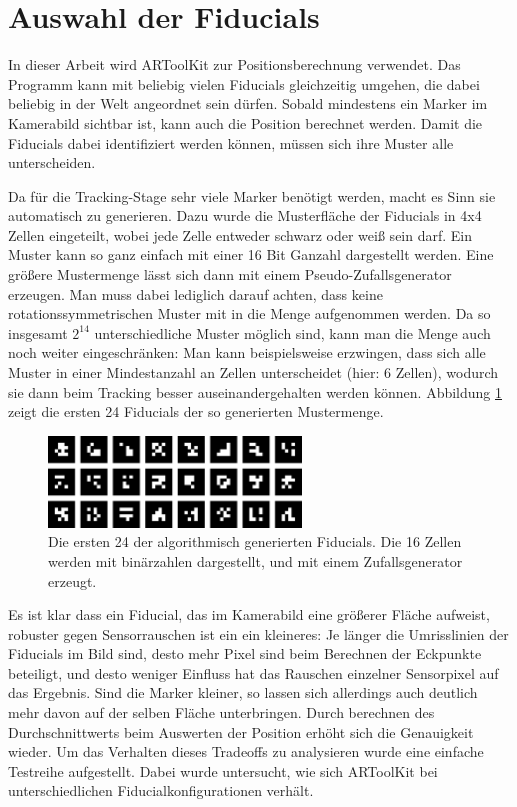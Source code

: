   
      
  \section{Auswahl der Fiducials}
   
   In dieser Arbeit wird ARToolKit zur Positionsberechnung verwendet. Das Programm kann mit beliebig vielen Fiducials gleichzeitig umgehen, die dabei beliebig in der Welt angeordnet sein dürfen.
   Sobald mindestens ein Marker im Kamerabild sichtbar ist, kann auch die Position berechnet werden.
   Damit die Fiducials dabei identifiziert werden können, müssen sich ihre Muster alle unterscheiden.
   
   Da für die Tracking-Stage sehr viele Marker benötigt werden, macht es Sinn sie automatisch zu generieren.
   Dazu wurde die Musterfläche der Fiducials in 4x4 Zellen eingeteilt, wobei jede Zelle entweder schwarz oder weiß sein darf.
   Ein Muster kann so ganz einfach mit einer 16 Bit Ganzahl dargestellt werden. 
   Eine größere Mustermenge lässt sich dann mit einem Pseudo-Zufallsgenerator erzeugen.
   Man muss dabei lediglich darauf achten, dass keine rotationssymmetrischen Muster mit in die Menge aufgenommen werden.
   Da so insgesamt $2^{14}$ unterschiedliche Muster möglich sind, kann man die Menge auch noch weiter eingeschränken:
   Man kann beispielsweise erzwingen, dass sich alle Muster in einer Mindestanzahl an Zellen unterscheidet (hier: 6 Zellen), wodurch sie dann beim Tracking besser auseinandergehalten werden können.
   Abbildung \ref{fig:fiducial_panel} zeigt die ersten 24 Fiducials der so generierten Mustermenge.

  \begin{figure}[H]
   \centering
   \includegraphics[width=0.6\textwidth]{../graphics/position/fiducial_panel_large.svg}
    \caption[Generierte Fiducials]{Die ersten 24 der algorithmisch generierten Fiducials. Die 16 Zellen werden mit binärzahlen dargestellt, und mit einem Zufallsgenerator erzeugt. } 
   \label{fig:fiducial_panel}
   \end{figure}

   Es ist klar dass ein Fiducial, das im Kamerabild eine größerer Fläche aufweist, robuster gegen Sensorrauschen ist ein ein kleineres:
   Je länger die Umrisslinien der Fiducials im Bild sind, desto mehr Pixel sind beim Berechnen der Eckpunkte beteiligt, und desto weniger Einfluss hat das Rauschen einzelner Sensorpixel auf das Ergebnis.
   Sind die Marker kleiner, so lassen sich allerdings auch deutlich mehr davon auf der selben Fläche unterbringen.
   Durch berechnen des Durchschnittwerts beim Auswerten der Position erhöht sich die Genauigkeit wieder.
   Um das Verhalten dieses Tradeoffs zu analysieren wurde eine einfache Testreihe aufgestellt.
   Dabei wurde untersucht, wie sich ARToolKit bei unterschiedlichen Fiducialkonfigurationen verhält.
 
